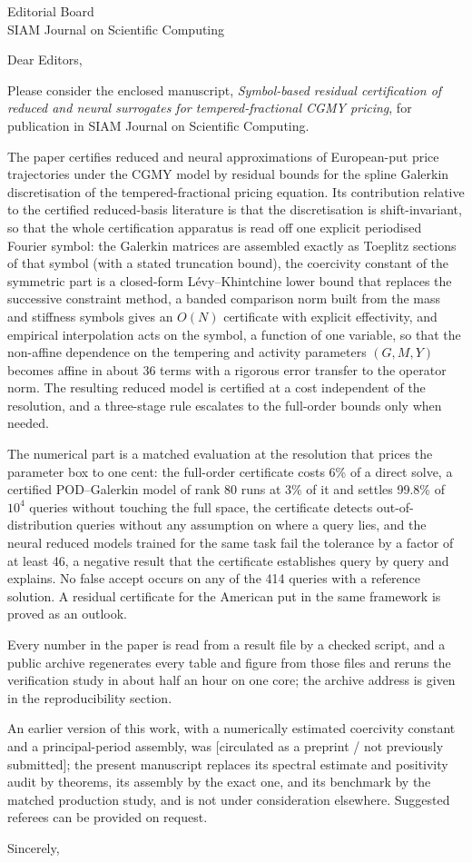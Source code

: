 \documentclass[11pt]{letter}
\begin{document}
\begin{letter}{Editorial Board\\SIAM Journal on Scientific Computing}
\opening{Dear Editors,}

Please consider the enclosed manuscript, \emph{Symbol-based residual certification of reduced and
neural surrogates for tempered-fractional CGMY pricing}, for publication in SIAM Journal on
Scientific Computing.

The paper certifies reduced and neural approximations of European-put price trajectories under the
CGMY model by residual bounds for the spline Galerkin discretisation of the tempered-fractional
pricing equation. Its contribution relative to the certified reduced-basis literature is that the
discretisation is shift-invariant, so that the whole certification apparatus is read off one
explicit periodised Fourier symbol: the Galerkin matrices are assembled exactly as Toeplitz sections
of that symbol (with a stated truncation bound), the coercivity constant of the symmetric part is a
closed-form Lévy--Khintchine lower bound that replaces the successive constraint method, a banded
comparison norm built from the mass and stiffness symbols gives an $O(N)$ certificate with explicit
effectivity, and empirical interpolation acts on the symbol, a function of one variable, so that the
non-affine dependence on the tempering and activity parameters $(G,M,Y)$ becomes affine in about 36
terms with a rigorous error transfer to the operator norm. The resulting reduced model is certified
at a cost independent of the resolution, and a three-stage rule escalates to the full-order bounds
only when needed.

The numerical part is a matched evaluation at the resolution that prices the parameter box to one
cent: the full-order certificate costs 6\% of a direct solve, a certified POD--Galerkin model of rank
80 runs at 3\% of it and settles 99.8\% of $10^4$ queries without touching the full space, the
certificate detects out-of-distribution queries without any assumption on where a query lies, and
the neural reduced models trained for the same task fail the tolerance by a factor of at least 46,
a negative result that the certificate establishes query by query and explains. No false accept
occurs on any of the 414 queries with a reference solution. A residual certificate for the American
put in the same framework is proved as an outlook.

Every number in the paper is read from a result file by a checked script, and a public archive
regenerates every table and figure from those files and reruns the verification study in about half
an hour on one core; the archive address is given in the reproducibility section.

An earlier version of this work, with a numerically estimated coercivity constant and a
principal-period assembly, was [circulated as a preprint / not previously submitted]; the present
manuscript replaces its spectral estimate and positivity audit by theorems, its assembly by the exact
one, and its benchmark by the matched production study, and is not under consideration elsewhere.
Suggested referees can be provided on request.

\closing{Sincerely,}
\end{letter}
\end{document}
